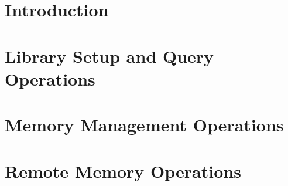 \documentclass[10pt]{book}
\begin{document}
\hypersetup{pageanchor=true,citecolor=blue}

\pagestyle{fancy}
\fancyhead{}
\fancyhead[LE,LO]{\insertDocVersion}
\fancyfoot[CE,CO]{\thepage}



\setcounter{tocdepth}{2}
\tableofcontents

\mainmatter  %
\pagestyle{headings}  \withlinenumbers

\startchap
\section*{Introduction}
%

%







\clearpage

\startchap
\section*{Library Setup and Query Operations}%
\startchap
\section*{Memory Management Operations}
\startchap
\section*{Remote Memory Operations}

\startchap

\startchap
\end{document}
